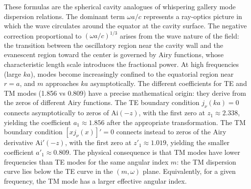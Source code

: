 \documentclass[
  aip,
  amsmath,amssymb,
  preprint
]{revtex4-1}
\begin{document}
These formulas are the spherical cavity analogues of whispering gallery mode dispersion 
relations. The dominant term $\omega a/c$ represents a ray-optics picture in which the 
wave circulates around the equator at the cavity surface. The negative correction 
proportional to $(\omega a/c)^{1/3}$ arises from the wave nature of the field: the 
transition between the oscillatory region near the cavity wall and the evanescent 
region toward the center is governed by Airy functions, whose characteristic length 
scale introduces the fractional power. At high frequencies (large $ka$), modes become 
increasingly confined to the equatorial region near $r = a$, and $m$ approaches $ka$ 
asymptotically.
The different coefficients for TE and TM modes (1.856 vs 0.809) have a precise 
mathematical origin: they derive from the zeros of different Airy functions. The TE 
boundary condition $j_\nu(ka) = 0$ connects asymptotically to zeros of $\mathrm{Ai}(-z)$, 
with the first zero at $z_1 \approx 2.338$, yielding the coefficient $a_1 \approx 1.856$ 
after the appropriate transformation. The TM boundary condition $[xj_\nu(x)]' = 0$ 
connects instead to zeros of the Airy derivative $\mathrm{Ai}'(-z)$, with the first zero 
at $z'_1 \approx 1.019$, yielding the smaller coefficient $a'_1 \approx 0.809$.
The physical consequence is that TM modes have lower frequencies than TE modes for the 
same angular index $m$: the TM dispersion curve lies below the TE curve in the 
$(m, \omega)$ plane. Equivalently, for a given frequency, the TM mode has a larger 
effective angular index.
\end{document}
